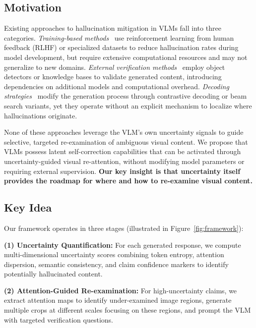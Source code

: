 \documentclass[12pt]{article}
\begin{document}
\subsection{Motivation}

Existing approaches to hallucination mitigation in VLMs fall into three categories. \textit{Training-based methods}~\citep{sun2023aligning, lee2023rlaif} use reinforcement learning from human feedback (RLHF) or specialized datasets to reduce hallucination rates during model development, but require extensive computational resources and may not generalize to new domains. \textit{External verification methods}~\citep{yin2023woodpecker, leng2023mitigating} employ object detectors or knowledge bases to validate generated content, introducing dependencies on additional models and computational overhead. \textit{Decoding strategies}~\citep{liu2024lcd, chuang2023dola} modify the generation process through contrastive decoding or beam search variants, yet they operate without an explicit mechanism to localize where hallucinations originate.

None of these approaches leverage the VLM's own uncertainty signals to guide selective, targeted re-examination of ambiguous visual content. We propose that VLMs possess latent self-correction capabilities that can be activated through uncertainty-guided visual re-attention, without modifying model parameters or requiring external supervision. \textbf{Our key insight is that uncertainty itself provides the roadmap for where and how to re-examine visual content.}

\subsection{Key Idea}

Our framework operates in three stages (illustrated in Figure~\ref{fig:framework}):

\noindent\textbf{(1) Uncertainty Quantification:} For each generated response, we compute multi-dimensional uncertainty scores combining token entropy, attention dispersion, semantic consistency, and claim confidence markers to identify potentially hallucinated content.

\vspace{1em}

\noindent\textbf{(2) Attention-Guided Re-examination:} For high-uncertainty claims, we extract attention maps to identify under-examined image regions, generate multiple crops at different scales focusing on these regions, and prompt the VLM with targeted verification questions.
\end{document}
